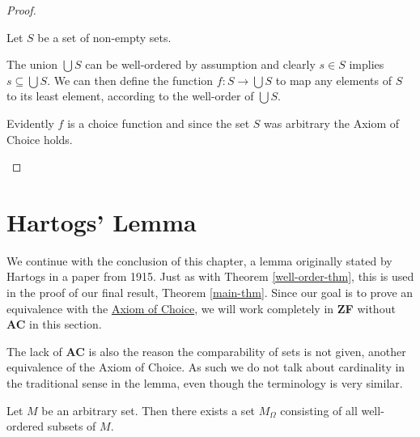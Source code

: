 \documentclass[../../main.tex]{subfiles}
\begin{document}
\begin{proof}
\begin{enumerate}
        Let $S$ be a set of non-empty sets.

        The union $\bigcup S$ can be well-ordered by assumption and clearly $s \in S$ implies $s \subseteq \bigcup S$.
        We can then define the function $f: S \to \bigcup S$ to map any elements of $S$ to its least element, according to the well-order of $\bigcup S$.
        
        Evidently $f$ is a choice function and since the set $S$ was arbitrary the Axiom of Choice holds. \qedhere
    \end{enumerate}
\end{proof}

\section{Hartogs' Lemma}\label{hartogs-lemma-section}
We continue with the conclusion of this chapter, a lemma originally stated by Hartogs in a paper from 1915. %
Just as with Theorem \ref{well-order-thm}, this is used in the proof of our final result, Theorem \ref{main-thm}.
Since our goal is to prove an equivalence with the \hyperref[choice-axiom]{Axiom of Choice}, we will work completely in \textbf{ZF} without \textbf{AC} in this section.

The lack of \textbf{AC} is also the reason the comparability of sets is not given, another equivalence of the Axiom of Choice. \cite{Har15}
As such we do not talk about cardinality in the traditional sense in the lemma, even though the terminology is very similar.

\begin{lemma}\label{well-order-set}\cite[Appendix]{Har15}
    Let $M$ be an arbitrary set.
    Then there exists a set $M_\Omega$ consisting of all well-ordered subsets of $M$.
\end{lemma}
\end{document}
